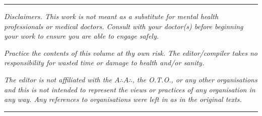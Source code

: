{\begin{center}
  \rule{1in}{0.5pt}
\end{center}


\textit{Disclaimers. This work is not meant as a substitute for mental health professionals or medical doctors. Consult with your doctor(s) before beginning your work to ensure you are able to engage safely.}

\textit{Practice the contents of this volume at thy own risk. The editor/compiler takes no responsibility for wasted time or damage to health and/or sanity.}

\textit{The editor is not affiliated with the $A{\therefore}A{\therefore}$, the O.T.O., or any other organisations and this is not intended to represent the views or practices of any organisation in any way. Any references to organisations were left in as in the original texts.}

\begin{center}
  \rule{1in}{0.5pt}
\end{center}
\vspace*{\fill}
}
